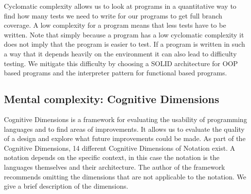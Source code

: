 Cyclomatic complexity allows us to look at programs in a quantitative way to
find how many tests we need to write for our programs to get full branch
coverage. A low complexity for a program means that less tests have to be
written.  Note that simply because a program has a low cyclomatic complexity it
does not imply that the program is easier to test. If a program is written in
such a way that it depends heavily on the environment it can also lead to
difficulty testing. We mitigate this difficulty by choosing a SOLID architecture
for OOP based programs and the interpreter pattern for functional based
programs.

\subsection{Mental complexity: Cognitive Dimensions}\label{cognitivedimensions}

Cognitive Dimensions is a framework for evaluating the usability of programming
languages and to find areas of improvements. It allows us to evaluate the
quality of a design and explore what future improvements could be made. As part
of the Cognitive Dimensions, 14 different Cognitive Dimensions of Notation
exist. A notation depends on the specific context, in this case the notation is
the languages themselves and their architecture. The author of the framework
recommends omitting the dimensions that are not applicable to the notation. We
give a brief description of the dimensions.

